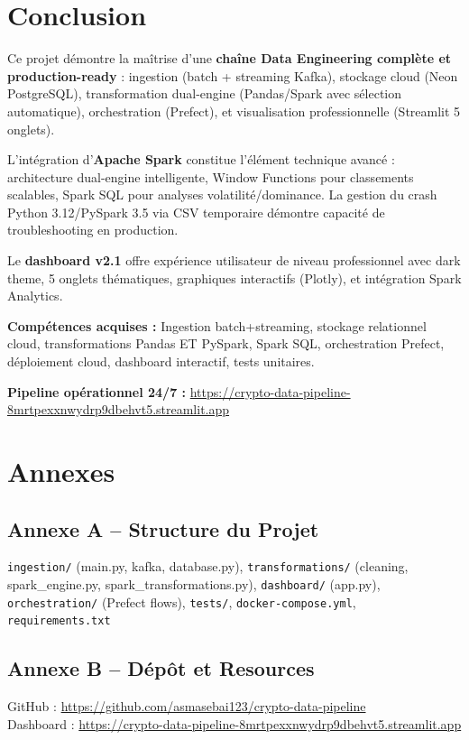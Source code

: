 \documentclass[11pt,a4paper]{article}
\begin{document}
\section{Conclusion}

Ce projet démontre la maîtrise d'une \textbf{chaîne Data Engineering complète et production-ready} : ingestion (batch + streaming Kafka), stockage cloud (Neon PostgreSQL), transformation dual-engine (Pandas/Spark avec sélection automatique), orchestration (Prefect), et visualisation professionnelle (Streamlit 5 onglets).

L'intégration d'\textbf{Apache Spark} constitue l'élément technique avancé : architecture dual-engine intelligente, Window Functions pour classements scalables, Spark SQL pour analyses volatilité/dominance. La gestion du crash Python 3.12/PySpark 3.5 via CSV temporaire démontre capacité de troubleshooting en production.

Le \textbf{dashboard v2.1} offre expérience utilisateur de niveau professionnel avec dark theme, 5 onglets thématiques, graphiques interactifs (Plotly), et intégration Spark Analytics.

\textbf{Compétences acquises :} Ingestion batch+streaming, stockage relationnel cloud, transformations Pandas ET PySpark, Spark SQL, orchestration Prefect, déploiement cloud, dashboard interactif, tests unitaires.

\textbf{Pipeline opérationnel 24/7 :} \url{https://crypto-data-pipeline-8mrtpexxnwydrp9dbehvt5.streamlit.app}

\newpage
\section*{Annexes}

\subsection*{Annexe A -- Structure du Projet}
\texttt{ingestion/} (main.py, kafka, database.py), \texttt{transformations/} (cleaning, spark\_engine.py, spark\_transformations.py), \texttt{dashboard/} (app.py), \texttt{orchestration/} (Prefect flows), \texttt{tests/}, \texttt{docker-compose.yml}, \texttt{requirements.txt}

\subsection*{Annexe B -- Dépôt et Resources}
GitHub : \url{https://github.com/asmasebai123/crypto-data-pipeline}\\
Dashboard : \url{https://crypto-data-pipeline-8mrtpexxnwydrp9dbehvt5.streamlit.app}
\end{document}
